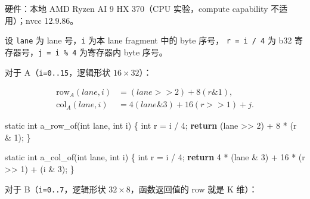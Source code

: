 \documentclass[11pt,a4paper,fontset=fandol]{ctexart}
\newenvironment{Shaded}{}{}
\newcommand{\AttributeTok}[1]{\textcolor[rgb]{0.49,0.56,0.16}{#1}}
\newcommand{\ControlFlowTok}[1]{\textcolor[rgb]{0.00,0.44,0.13}{\textbf{#1}}}
\newcommand{\DataTypeTok}[1]{\textcolor[rgb]{0.56,0.13,0.00}{#1}}
\newcommand{\DecValTok}[1]{\textcolor[rgb]{0.25,0.63,0.44}{#1}}
\newcommand{\NormalTok}[1]{#1}
\newcommand{\OperatorTok}[1]{\textcolor[rgb]{0.40,0.40,0.40}{#1}}
\begin{document}
\begin{answer}

硬件：本地 AMD Ryzen AI 9 HX 370（CPU 实验，compute capability
不适用）；nvcc 12.9.86。

设 \texttt{lane} 为 lane 号，\texttt{i} 为本 lane fragment 中的 byte
序号， \texttt{r\ =\allowbreak{}\ i\ /\allowbreak{}\ 4} 为 b32
寄存器号，\texttt{j\ =\allowbreak{}\ i\ \%\ 4} 为寄存器内 byte 序号。

对于
A（\texttt{i=\allowbreak{}0.\allowbreak{}.\allowbreak{}15}，逻辑形状
\(16\times32\)）：

\[
\begin{aligned}
\mathrm{row}_A(lane,i) &= (lane\mathbin{>>}2)+8(r\mathbin{\&}1),\\
\mathrm{col}_A(lane,i) &= 4(lane\mathbin{\&}3)+16(r\mathbin{>>}1)+j.
\end{aligned}
\]

\begin{Shaded}
\begin{Highlighting}[]
\AttributeTok{static} \DataTypeTok{int}\NormalTok{ a\_row\_of}\OperatorTok{(}\DataTypeTok{int}\NormalTok{ lane}\OperatorTok{,} \DataTypeTok{int}\NormalTok{ i}\OperatorTok{)} \OperatorTok{\{}
    \DataTypeTok{int}\NormalTok{ r }\OperatorTok{=}\NormalTok{ i }\OperatorTok{/} \DecValTok{4}\OperatorTok{;}
    \ControlFlowTok{return} \OperatorTok{(}\NormalTok{lane }\OperatorTok{\textgreater{}\textgreater{}} \DecValTok{2}\OperatorTok{)} \OperatorTok{+} \DecValTok{8} \OperatorTok{*} \OperatorTok{(}\NormalTok{r }\OperatorTok{\&} \DecValTok{1}\OperatorTok{);}
\OperatorTok{\}}

\AttributeTok{static} \DataTypeTok{int}\NormalTok{ a\_col\_of}\OperatorTok{(}\DataTypeTok{int}\NormalTok{ lane}\OperatorTok{,} \DataTypeTok{int}\NormalTok{ i}\OperatorTok{)} \OperatorTok{\{}
    \DataTypeTok{int}\NormalTok{ r }\OperatorTok{=}\NormalTok{ i }\OperatorTok{/} \DecValTok{4}\OperatorTok{;}
    \ControlFlowTok{return} \DecValTok{4} \OperatorTok{*} \OperatorTok{(}\NormalTok{lane }\OperatorTok{\&} \DecValTok{3}\OperatorTok{)} \OperatorTok{+} \DecValTok{16} \OperatorTok{*} \OperatorTok{(}\NormalTok{r }\OperatorTok{\textgreater{}\textgreater{}} \DecValTok{1}\OperatorTok{)} \OperatorTok{+} \OperatorTok{(}\NormalTok{i }\OperatorTok{\&} \DecValTok{3}\OperatorTok{);}
\OperatorTok{\}}
\end{Highlighting}
\end{Shaded}

对于 B（\texttt{i=\allowbreak{}0.\allowbreak{}.\allowbreak{}7}，逻辑形状
\(32\times8\)，函数返回值的 row 就是 K 维）：


\end{answer}
\end{document}
